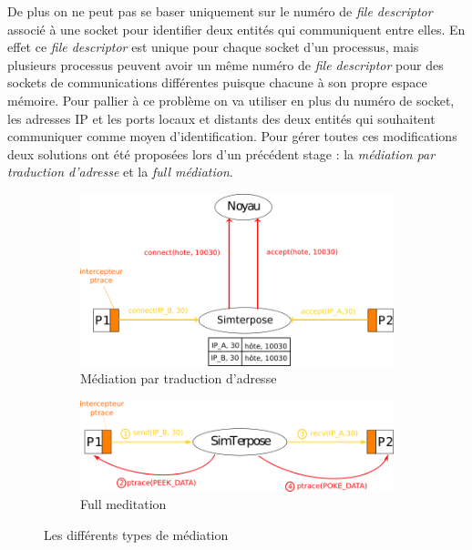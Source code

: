 De plus on ne peut pas se baser uniquement sur le numéro de \textit{file
  descriptor} associé à une socket pour identifier deux entités qui communiquent
entre elles. En effet ce \textit{file descriptor} est unique pour chaque socket
d'un processus, mais plusieurs processus peuvent avoir un même numéro de
\textit{file descriptor} pour des sockets de communications différentes puisque
chacune à son propre espace mémoire. Pour pallier à ce problème on va utiliser
en plus du numéro de socket, les adresses IP et les ports locaux et distants des
deux entités qui souhaitent communiquer comme moyen d'identification. Pour gérer
toutes ces modifications deux solutions ont été proposées lors d'un précédent
stage \citep{GUILLAUME:Interceptionsyscall}: la \textit{médiation par traduction
  d'adresse} et la \textit{full médiation}.

 \begin{figure}[H]
   \centering
   \begin{subfigure}{0.5\textwidth}
   \includegraphics[scale=0.5]{Pictures/png/Mediation_translation_v2}
   \caption{Médiation par traduction d'adresse}
   \label{ADDRESS_TRANSLATION}
   \end{subfigure}
   \begin{subfigure}{0.4\textwidth}
     \includegraphics[scale=0.5]{Pictures/png/Mediation_full_v2}
  \caption{Full meditation}
  \label{FULL_MEDIATION}
   \end{subfigure}
   \caption{Les différents types de médiation}
   \label{MEDIATION}
 \end{figure}
 
